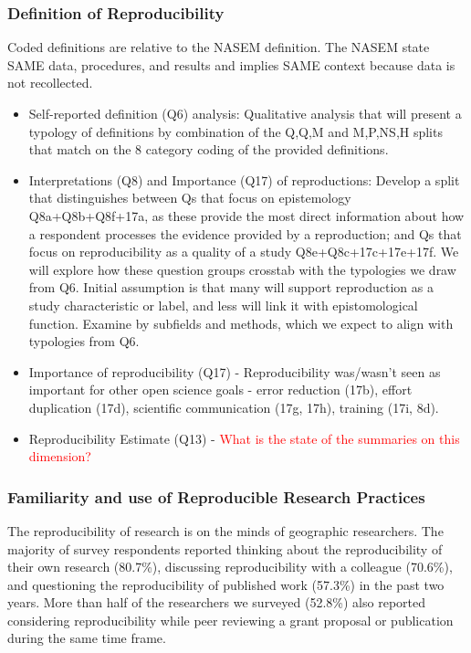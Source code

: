 \documentclass[]{interact}
\theoremstyle{plain}%
\theoremstyle{definition}
\theoremstyle{remark}
\begin{document}
\subsubsection*{Definition of Reproducibility}
Coded definitions are relative to the NASEM definition. The NASEM state SAME data, procedures, and results and implies SAME context because data is not recollected. 
\begin{itemize}
    \item Self-reported definition (Q6) analysis: Qualitative analysis that will present a typology of definitions by combination of the Q,Q,M and M,P,NS,H splits that match on the 8 category coding of the provided definitions. 
    \item Interpretations (Q8) and Importance (Q17) of reproductions: Develop a split that distinguishes between Qs that focus on epistemology Q8a+Q8b+Q8f+17a, as these provide the most direct information about how a respondent processes the evidence provided by a reproduction; and Qs that focus on reproducibility as a quality of a study Q8e+Q8c+17c+17e+17f. We will explore how these question groups crosstab with the typologies we draw from Q6. Initial assumption is that many will support reproduction as a study characteristic or label, and less will link it with epistomological function. Examine by subfields and methods, which we expect to align with typologies from Q6. 
    \item Importance of reproducibility (Q17) - Reproducibility was/wasn't seen as important for other open science goals - error reduction (17b), effort duplication (17d), scientific communication (17g, 17h), training (17i, 8d).
    \item Reproducibility Estimate (Q13) - \textcolor{red}{What is the state of the summaries on this dimension?}
\end{itemize}

\subsubsection*{Familiarity and use of Reproducible Research Practices}
The reproducibility of research is on the minds of geographic researchers. 
The majority of survey respondents reported thinking about the reproducibility of their own research (80.7\%), discussing reproducibility with a colleague (70.6\%), and questioning the reproducibility of published work (57.3\%) in the past two years. 
More than half of the researchers we surveyed (52.8\%) also reported considering reproducibility while peer reviewing a grant proposal or publication during the same time frame. 
\end{document}
